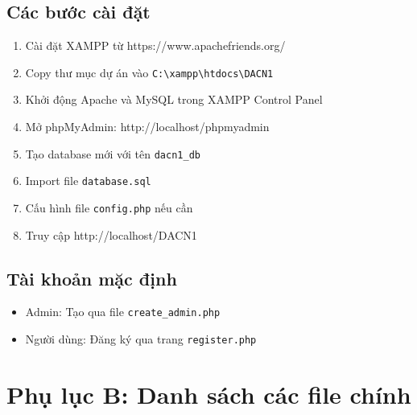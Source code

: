 \documentclass[a4paper,12pt]{report}
\begin{document}
\subsection*{Các bước cài đặt}
\begin{enumerate}
    \item Cài đặt XAMPP từ https://www.apachefriends.org/
    \item Copy thư mục dự án vào \texttt{C:\textbackslash xampp\textbackslash htdocs\textbackslash DACN1}
    \item Khởi động Apache và MySQL trong XAMPP Control Panel
    \item Mở phpMyAdmin: http://localhost/phpmyadmin
    \item Tạo database mới với tên \texttt{dacn1\_db}
    \item Import file \texttt{database.sql}
    \item Cấu hình file \texttt{config.php} nếu cần
    \item Truy cập http://localhost/DACN1
\end{enumerate}

\subsection*{Tài khoản mặc định}
\begin{itemize}
    \item Admin: Tạo qua file \texttt{create\_admin.php}
    \item Người dùng: Đăng ký qua trang \texttt{register.php}
\end{itemize}

\section*{Phụ lục B: Danh sách các file chính}
\end{document}
